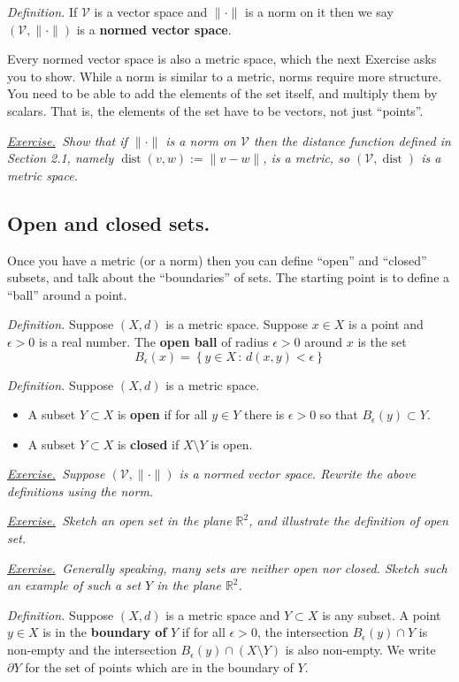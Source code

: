 \documentclass[12pt]{article}
\newcommand{\cV}{\mathcal{V}}
\newcommand{\RR}{\mathbb{R}}
\newcommand{\eps}{\epsilon}
\newcommand{\sect}[1]{\subsection*{#1.}}
\newcommand{\defin}{\emph{Definition.}\,\,}
\newcommand{\exer}[2]{\emph{\underline{Exercise.}\, #2} \vspace*{#1mm}}
\begin{document}
\defin If $\cV$ is a vector space and $\|\cdot\|$ is a norm on it then we say $(\cV,\|\cdot\|)$ is a \textbf{normed vector space}.

Every normed vector space is also a metric space, which the next Exercise asks you to show.  While a norm is similar to a metric, norms require more structure.  You need to be able to add the elements of the set itself, and multiply them by scalars.  That is, the elements of the set have to be vectors, not just ``points''.

\exer{50}{Show that if $\|\cdot\|$ is a norm on $\cV$ then the distance function defined in Section 2.1, namely $\operatorname{dist}(v,w) := \|v-w\|$, is a metric, so $(\cV,\operatorname{dist})$ is a metric space.}


\sect{Open and closed sets}

Once you have a metric (or a norm) then you can define ``open'' and ``closed'' subsets, and talk about the ``boundaries'' of sets.  The starting point is to define a ``ball'' around a point.

\defin Suppose $(X,d)$ is a metric space.  Suppose $x\in X$ is a point and $\eps>0$ is a real number.  The \textbf{open ball} of radius $\eps>0$ around $x$ is the set
	$$B_\eps(x) = \left\{y\in X\,:\,d(x,y) < \eps\right\}$$ 

\defin Suppose $(X,d)$ is a metric space.
\begin{itemize}
\item A subset $Y\subset X$ is \textbf{open} if for all $y\in Y$ there is $\eps>0$ so that $B_\eps(y) \subset Y$.
\item A subset $Y\subset X$ is \textbf{closed} if $X \setminus Y$ is open.
\end{itemize}

\exer{60}{Suppose $(\cV,\|\cdot\|)$ is a normed vector space.  Rewrite the above definitions using the norm.}

\exer{60}{Sketch an open set in the plane $\RR^2$, and illustrate the definition of open set.}

\clearpage\newpage
\exer{60}{Generally speaking, many sets are neither open nor closed.  Sketch such an example of such a set $Y$ in the plane $\RR^2$.}

\defin Suppose $(X,d)$ is a metric space and $Y \subset X$ is any subset.  A point $y\in X$ is in the \textbf{boundary of } $Y$ if for all $\eps>0$, the intersection $B_\eps(y)\cap Y$ is non-empty and the intersection $B_\eps(y)\cap (X\setminus Y)$ is also non-empty.  We write $\partial Y$ for the set of points which are in the boundary of $Y$.
\end{document}
